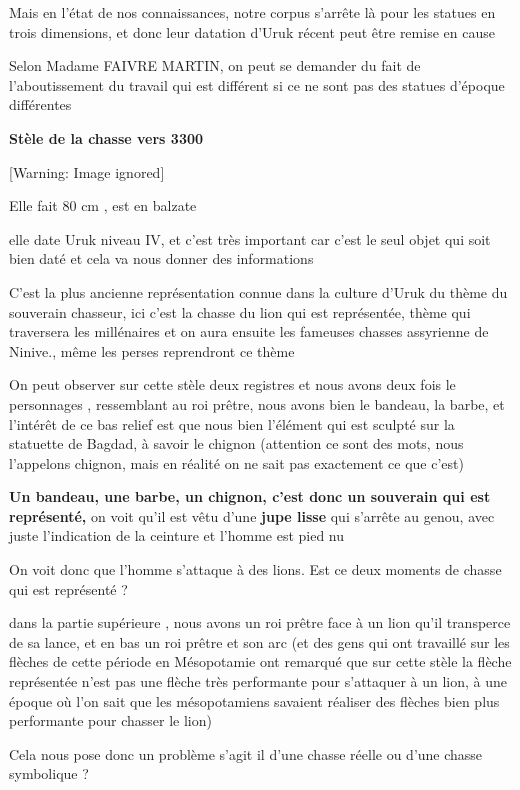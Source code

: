 \documentclass[a4paper,10pt]{article}
\begin{document}
Mais en l'état de nos connaissances, notre corpus
s'arrête là pour les statues en trois dimensions,  et
donc leur datation d'Uruk récent peut être remise en
cause 

Selon Madame FAIVRE MARTIN, on peut se demander du fait de
l'aboutissement du travail qui est différent si ce ne
sont pas des statues d'époque différentes

\textbf{Stèle de la chasse vers 3300}

  [Warning: Image ignored] %
 

Elle fait 80 cm , est en balzate

elle date Uruk niveau IV, et c'est très important car
c'est le seul objet qui soit bien daté et cela va nous
donner des informations

C'est la plus ancienne représentation connue dans la
culture d'Uruk du thème du souverain chasseur, ici
c'est la chasse du lion qui est représentée, thème qui
traversera les millénaires et on aura ensuite les fameuses chasses
assyrienne de Ninive., même les perses reprendront ce thème 

On peut observer sur cette stèle deux registres et nous avons deux fois
le personnages , ressemblant au roi prêtre, nous avons bien le bandeau,
la barbe, et l'intérêt de ce bas relief est que nous
bien l'élément qui est sculpté sur la statuette de
Bagdad, à savoir le chignon (attention ce sont des mots, nous
l'appelons chignon, mais en réalité on ne sait pas
exactement ce que c'est)

\textbf{Un bandeau, une barbe, un chignon, c'est donc
un souverain qui est représenté,} on voit qu'il est
vêtu d'une \textbf{jupe lisse} qui
s'arrête au genou, avec juste
l'indication de la ceinture et
l'homme est pied nu

On voit donc que l'homme s'attaque à
des lions. Est ce deux moments de chasse qui est représenté ? 

dans la partie supérieure , nous avons un roi prêtre face à un lion
qu'il transperce de sa lance, et en bas un roi prêtre
et son arc (et des gens qui ont travaillé sur les flèches de cette
période en Mésopotamie ont remarqué que sur cette stèle la flèche
représentée n'est pas une flèche très performante pour
s'attaquer à un lion, à une époque où
l'on sait que les mésopotamiens savaient réaliser des
flèches bien plus performante pour chasser le lion)

Cela nous pose donc un problème  s'agit il
d'une chasse réelle ou d'une chasse
symbolique ?
\end{document}
